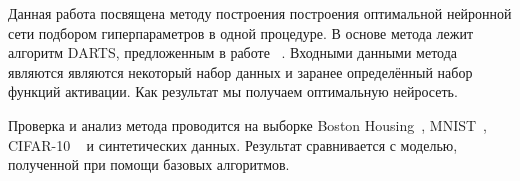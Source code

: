 \documentclass[12pt,twoside]{article}
\begin{document}
	Данная работа посвящена методу построения построения оптимальной нейронной сети подбором гиперпараметров в одной процедуре. В основе метода лежит алгоритм DARTS, предложенным в работе ~\cite{liu2018darts}. Входными данными метода являются являются некоторый набор данных и заранее определённый набор функций активации. Как результат мы получаем оптимальную нейросеть.
	
	Проверка и анализ метода проводится на выборке Boston Housing~\cite{Boston}, MNIST~\cite{MNIST},  CIFAR-10 ~\cite{CIFAR-10} и синтетических данных. Результат сравнивается с моделью, полученной при помощи базовых алгоритмов.
	 

\cite{bishop2006}



\end{document}
